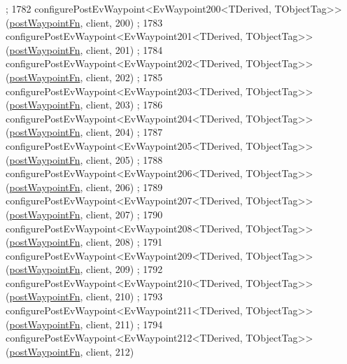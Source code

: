 \begin{DoxyCode}
      ;
1782     configurePostEvWaypoint<EvWaypoint200<TDerived, TObjectTag>>(\hyperlink{classmove__base__z__client_1_1WaypointEventDispatcher_acc538eb7506c13f7cca2268a1742dadd}{postWaypointFn}, client, 200)
      ;
1783     configurePostEvWaypoint<EvWaypoint201<TDerived, TObjectTag>>(\hyperlink{classmove__base__z__client_1_1WaypointEventDispatcher_acc538eb7506c13f7cca2268a1742dadd}{postWaypointFn}, client, 201)
      ;
1784     configurePostEvWaypoint<EvWaypoint202<TDerived, TObjectTag>>(\hyperlink{classmove__base__z__client_1_1WaypointEventDispatcher_acc538eb7506c13f7cca2268a1742dadd}{postWaypointFn}, client, 202)
      ;
1785     configurePostEvWaypoint<EvWaypoint203<TDerived, TObjectTag>>(\hyperlink{classmove__base__z__client_1_1WaypointEventDispatcher_acc538eb7506c13f7cca2268a1742dadd}{postWaypointFn}, client, 203)
      ;
1786     configurePostEvWaypoint<EvWaypoint204<TDerived, TObjectTag>>(\hyperlink{classmove__base__z__client_1_1WaypointEventDispatcher_acc538eb7506c13f7cca2268a1742dadd}{postWaypointFn}, client, 204)
      ;
1787     configurePostEvWaypoint<EvWaypoint205<TDerived, TObjectTag>>(\hyperlink{classmove__base__z__client_1_1WaypointEventDispatcher_acc538eb7506c13f7cca2268a1742dadd}{postWaypointFn}, client, 205)
      ;
1788     configurePostEvWaypoint<EvWaypoint206<TDerived, TObjectTag>>(\hyperlink{classmove__base__z__client_1_1WaypointEventDispatcher_acc538eb7506c13f7cca2268a1742dadd}{postWaypointFn}, client, 206)
      ;
1789     configurePostEvWaypoint<EvWaypoint207<TDerived, TObjectTag>>(\hyperlink{classmove__base__z__client_1_1WaypointEventDispatcher_acc538eb7506c13f7cca2268a1742dadd}{postWaypointFn}, client, 207)
      ;
1790     configurePostEvWaypoint<EvWaypoint208<TDerived, TObjectTag>>(\hyperlink{classmove__base__z__client_1_1WaypointEventDispatcher_acc538eb7506c13f7cca2268a1742dadd}{postWaypointFn}, client, 208)
      ;
1791     configurePostEvWaypoint<EvWaypoint209<TDerived, TObjectTag>>(\hyperlink{classmove__base__z__client_1_1WaypointEventDispatcher_acc538eb7506c13f7cca2268a1742dadd}{postWaypointFn}, client, 209)
      ;
1792     configurePostEvWaypoint<EvWaypoint210<TDerived, TObjectTag>>(\hyperlink{classmove__base__z__client_1_1WaypointEventDispatcher_acc538eb7506c13f7cca2268a1742dadd}{postWaypointFn}, client, 210)
      ;
1793     configurePostEvWaypoint<EvWaypoint211<TDerived, TObjectTag>>(\hyperlink{classmove__base__z__client_1_1WaypointEventDispatcher_acc538eb7506c13f7cca2268a1742dadd}{postWaypointFn}, client, 211)
      ;
1794     configurePostEvWaypoint<EvWaypoint212<TDerived, TObjectTag>>(\hyperlink{classmove__base__z__client_1_1WaypointEventDispatcher_acc538eb7506c13f7cca2268a1742dadd}{postWaypointFn}, client, 212)

\end{DoxyCode}
